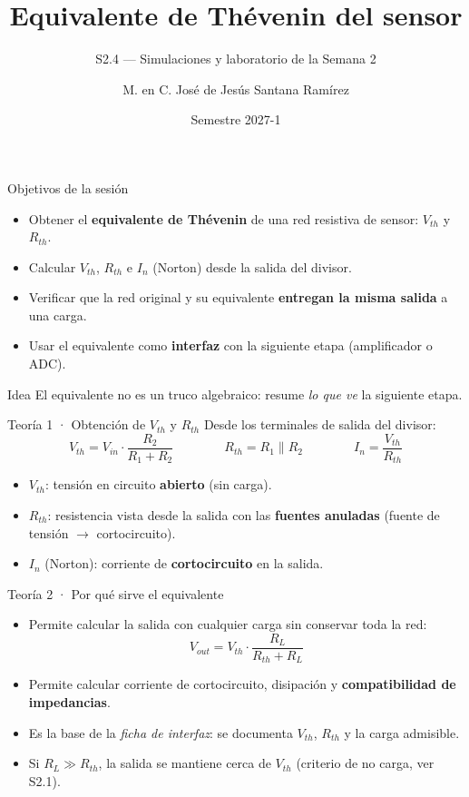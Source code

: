 \documentclass[aspectratio=169]{beamer}
\title[S2.4 · Thévenin del sensor]{Equivalente de Thévenin del sensor}
\subtitle{S2.4 — Simulaciones y laboratorio de la Semana 2}
\institute{Licenciatura en Ingeniería Aeroespacial\\ UNAM · ENES Unidad Juriquilla}
\author{M. en C. José de Jesús Santana Ramírez}
\date{Semestre 2027-1}
\begin{document}
\begin{frame}[plain]
  \titlepage
\end{frame}

\begin{frame}{Objetivos de la sesión}
  \begin{itemize}
    \item Obtener el \textbf{equivalente de Thévenin} de una red resistiva de sensor: $V_{th}$ y $R_{th}$.
    \item Calcular $V_{th}$, $R_{th}$ e $I_n$ (Norton) desde la salida del divisor.
    \item Verificar que la red original y su equivalente \textbf{entregan la misma salida} a una carga.
    \item Usar el equivalente como \textbf{interfaz} con la siguiente etapa (amplificador o ADC).
  \end{itemize}
  \pause
  \begin{block}{Idea}
    El equivalente no es un truco algebraico: resume \emph{lo que ve} la siguiente etapa.
  \end{block}
\end{frame}

\begin{frame}{Teoría 1 · Obtención de $V_{th}$ y $R_{th}$}
  Desde los terminales de salida del divisor:
  \[
    V_{th} = V_{in}\cdot\frac{R_2}{R_1+R_2}
    \qquad\qquad
    R_{th} = R_1\parallel R_2
    \qquad\qquad
    I_n = \frac{V_{th}}{R_{th}}
  \]
  \pause
  \begin{itemize}
    \item $V_{th}$: tensión en circuito \textbf{abierto} (sin carga).
    \item $R_{th}$: resistencia vista desde la salida con las \textbf{fuentes anuladas}
      (fuente de tensión $\rightarrow$ cortocircuito).
    \item $I_n$ (Norton): corriente de \textbf{cortocircuito} en la salida.
  \end{itemize}
\end{frame}

\begin{frame}{Teoría 2 · Por qué sirve el equivalente}
  \begin{itemize}
    \item Permite calcular la salida con cualquier carga sin conservar toda la red:
      \[
        V_{out} = V_{th}\cdot\frac{R_L}{R_{th}+R_L}
      \]
    \item Permite calcular corriente de cortocircuito, disipación y \textbf{compatibilidad de impedancias}.
    \item Es la base de la \emph{ficha de interfaz}: se documenta $V_{th}$, $R_{th}$ y la carga admisible.
    \item Si $R_L \gg R_{th}$, la salida se mantiene cerca de $V_{th}$ (criterio de no carga, ver S2.1).
  \end{itemize}
\end{frame}
\end{document}
